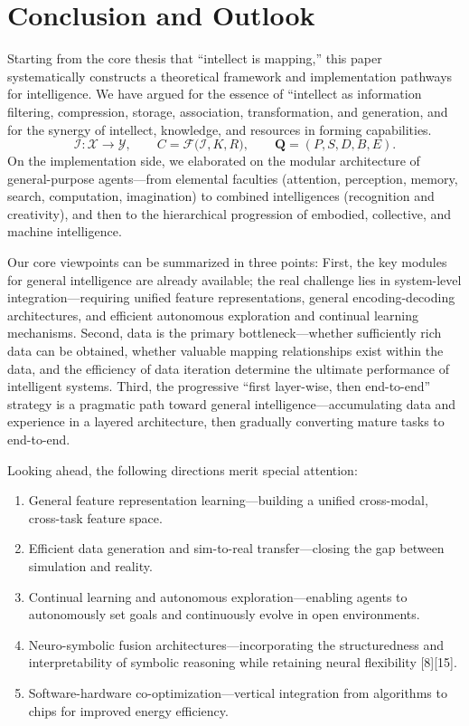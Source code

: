 \documentclass[12pt,a4paper]{article}
\newcommand{\Intell}{\mathcal{I}}
\begin{document}
\section{Conclusion and Outlook}
Starting from the core thesis that ``intellect is mapping,'' this paper systematically constructs a theoretical framework and implementation pathways for intelligence. We have argued for the essence of ``intellect as information filtering, compression, storage, association, transformation, and generation, and for the synergy of intellect, knowledge, and resources in forming capabilities.
\begin{equation}
\Intell:\mathcal{X}\to\mathcal{Y},\qquad
C=\mathcal{F}\bigl(\Intell,K,R\bigr),\qquad
\mathbf{Q}=(P,S,D,B,E).
\label{eq:conclusion-core}
\end{equation}
On the implementation side, we elaborated on the modular architecture of general-purpose agents---from elemental faculties (attention, perception, memory, search, computation, imagination) to combined intelligences (recognition and creativity), and then to the hierarchical progression of embodied, collective, and machine intelligence.

Our core viewpoints can be summarized in three points:
First, the key modules for general intelligence are already available; the real challenge lies in system-level integration\allowbreak{}---requiring unified feature representations, general encoding-decoding architectures, and efficient autonomous exploration and continual learning mechanisms.
Second, data is the primary bottleneck---whether sufficiently rich data can be obtained, whether valuable mapping relationships exist within the data, and the efficiency of data iteration determine the ultimate performance of intelligent systems.
Third, the progressive ``first layer-wise, then end-to-end'' strategy is a pragmatic path toward general intelligence---accumulating data and experience in a layered architecture, then gradually converting mature tasks to end-to-end.

Looking ahead, the following directions merit special attention:
\begin{enumerate}
\item General feature representation learning---building a unified cross-modal, cross-task feature space.
\item Efficient data generation and sim-to-real transfer---closing the gap between simulation and reality.
\item Continual learning and autonomous exploration---enabling agents to autonomously set goals and continuously evolve in open environments.
\item Neuro-symbolic fusion architectures---incorporating the structuredness and interpretability of symbolic reasoning while retaining neural flexibility [8][15].
\item Software-hardware co-optimization---vertical integration from algorithms to chips for improved energy efficiency.
\end{enumerate}
\end{document}
